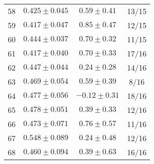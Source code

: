 \begin{tabular}{c|c|c|c}
58 & $0.425\pm0.045$ & $0.59\pm0.41$ & 13/15 \\
59 & $0.417\pm0.047$ & $0.85\pm0.47$ & 12/15 \\
60 & $0.444\pm0.037$ & $0.70\pm0.32$ & 11/15 \\
61 & $0.417\pm0.040$ & $0.70\pm0.33$ & 17/16 \\
62 & $0.447\pm0.044$ & $0.24\pm0.28$ & 14/16 \\
63 & $0.469\pm0.054$ & $0.59\pm0.39$ & 8/16 \\
64 & $0.477\pm0.056$ & $-0.12\pm0.31$ & 18/16 \\
65 & $0.478\pm0.051$ & $0.39\pm0.33$ & 12/16 \\
66 & $0.473\pm0.071$ & $0.76\pm0.57$ & 11/16 \\
67 & $0.548\pm0.089$ & $0.24\pm0.48$ & 12/16 \\
68 & $0.460\pm0.094$ & $0.39\pm0.63$ & 16/16 \\
\end{tabular}
